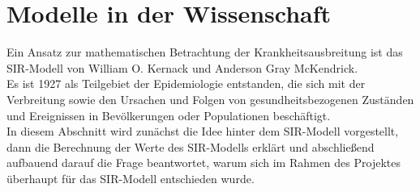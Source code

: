 \section*{Modelle in der Wissenschaft}
Ein Ansatz zur mathematischen Betrachtung der Krankheitsausbreitung ist das SIR-Modell von William O. Kernack und Anderson Gray McKendrick.\\
Es ist 1927 als Teilgebiet der Epidemiologie entstanden, die sich mit der Verbreitung sowie den Ursachen und Folgen von gesundheitsbezogenen Zuständen und Ereignissen in Bevölkerungen oder Populationen beschäftigt.\\
In diesem Abschnitt wird zunächst die Idee hinter dem SIR-Modell vorgestellt, dann die Berechnung der Werte des SIR-Modells erklärt und abschließend aufbauend darauf die Frage beantwortet, warum sich im Rahmen des Projektes überhaupt für das SIR-Modell entschieden wurde.

